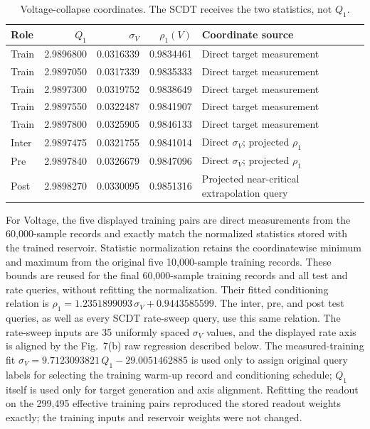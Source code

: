 \documentclass[10pt,a4paper]{article}
\begin{document}
\begin{table}[H]
\centering
\caption{Voltage-collapse coordinates. The SCDT receives the two statistics,
not $Q_1$.}
\label{tab:voltage-coordinates}
\small
\begin{tabular}{@{}lrrrl@{}}
\toprule
Role & $Q_1$ & $\sigma_V$ & $\rho_1(V)$ & Coordinate source \\
\midrule
Train & 2.9896800 & 0.0316339 & 0.9834461 & Direct target measurement \\
Train & 2.9897050 & 0.0317339 & 0.9835333 & Direct target measurement \\
Train & 2.9897300 & 0.0319752 & 0.9838649 & Direct target measurement \\
Train & 2.9897550 & 0.0322487 & 0.9841907 & Direct target measurement \\
Train & 2.9897800 & 0.0325905 & 0.9846133 & Direct target measurement \\
\rowcolor{bluegray} Inter & 2.9897475 & 0.0321755 & 0.9841014 & Direct $\sigma_V$; projected $\rho_1$ \\
\rowcolor{bluegray} Pre & 2.9897840 & 0.0326679 & 0.9847096 & Direct $\sigma_V$; projected $\rho_1$ \\
\rowcolor{bluegray} Post & 2.9898270 & 0.0330095 & 0.9851316 & Projected near-critical extrapolation query \\
\bottomrule
\end{tabular}
\end{table}

For Voltage, the five displayed training pairs are direct measurements from
the 60,000-sample records and exactly match the normalized statistics stored
with the trained reservoir. Statistic normalization retains the coordinatewise
minimum and maximum from the original five 10,000-sample training records.
These bounds are reused for the final 60,000-sample training records and all
test and rate queries, without refitting the normalization. Their fitted conditioning relation is
$\rho_1=1.2351899093\,\sigma_V+0.9443585599$. The inter, pre, and post
test queries, as well as every SCDT rate-sweep query, use this same relation.
The rate-sweep inputs are 35 uniformly spaced $\sigma_V$ values, and the
displayed rate axis is aligned by the Fig.~7(b) raw regression described
below. The measured-training fit $\sigma_V=9.7123093821\,Q_1-29.0051462885$
is used only to assign original query labels for selecting the training
warm-up record and conditioning schedule; $Q_1$ itself is used only for
target generation and axis alignment. Refitting the readout
on the 299,495 effective training pairs reproduced the stored readout weights
exactly; the training inputs and reservoir weights were not changed.
\end{document}
